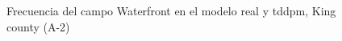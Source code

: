 \begin{figure}[H]
    \centering
    
    \caption{Frecuencia del campo Waterfront en el modelo real y tddpm, King county (A-2)}
    \label{frecuency-tddpm-waterfront}
\end{figure}